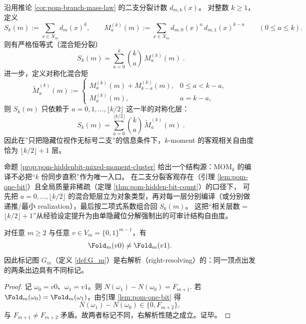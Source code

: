 \begin{proposition}\label{prop:pom-hiddenbit-mixed-moment-cluster}\label{prop:pom-mixed-moment-clusters}
沿用推论 \ref{cor:pom-branch-mass-law} 的二支分裂计数 \(d_{m,b}(x)\)。
对整数 \(k\ge 1\)，定义
\[
S_k(m):=\sum_{x\in X_m} d_m(x)^k,
\qquad
M^{(k)}_{a}(m):=\sum_{x\in X_m} d_{m,0}(x)^a\,d_{m,1}(x)^{k-a}\qquad(0\le a\le k).
\]
则有严格恒等式（混合矩分裂）
\[
\boxed{\;
S_k(m)=\sum_{a=0}^{k}\binom{k}{a}\,M^{(k)}_{a}(m)\; }.
\]
进一步，定义对称化混合矩
\[
\widetilde M^{(k)}_{a}(m):=
\begin{cases}
M^{(k)}_{a}(m)+M^{(k)}_{k-a}(m), & 0\le a<k-a,\\
M^{(k)}_{a}(m), & a=k-a,
\end{cases}
\]
则 \(S_k(m)\) 只依赖于 \(a=0,1,\dots,\lfloor k/2\rfloor\) 这一半的对称化层：
\[
\boxed{\;
S_k(m)=\sum_{a=0}^{\lfloor k/2\rfloor}\binom{k}{a}\,\widetilde M^{(k)}_{a}(m)\; }.
\]
因此在”只把隐藏位视作无标号二支”的信息条件下，\(k\)-moment 的客观相关自由度恰为 \(\lfloor k/2\rfloor+1\) 层。
\end{proposition}

\begin{remark}[含义：以混合矩簇为类型的分层编译]\label{rem:pom-hiddenbit-mixed-moment-typing}
命题 \ref{prop:pom-hiddenbit-mixed-moment-cluster} 给出一个结构源：\(\mathrm{MOM}_k\) 的编译不必把“\(k\) 份同步直积”作为唯一入口。
在二支分裂客观存在（引理 \ref{lem:pom-one-bit}）且全局质量非稀疏（定理 \ref{thm:pom-hidden-bit-count}）的口径下，
可先把 \(a=0,\dots,\lfloor k/2\rfloor\) 的混合矩层立为对象类型，再对每一层分别编译（或分别做递推/最小 realization），最后按二项式系数组合回 \(S_k(m)\)。
这把“相关层数 = \(\lfloor k/2\rfloor+1\)”从经验设定提升为由单隐藏位分解强制出的可审计结构自由度。
\end{remark}

\begin{theorem}[一步可判别与右解析性]\label{thm:pom-right-resolving}
对任意 $m\ge 2$ 与任意 $v\in V_m=\{0,1\}^{m-1}$，有
\[
\Fold_m(v0)\neq \Fold_m(v1).
\]
因此标记图 $G_m$（定义 \ref{def:G_m}）是右解析（right-resolving）的：同一顶点出发的两条出边具有不同标记。
\end{theorem}
\begin{proof}
记 $\omega_0=v0$、$\omega_1=v1$。则 $N(\omega_1)-N(\omega_0)=F_{m+1}$. 若 $\Fold_m(\omega_0)=\Fold_m(\omega_1)$，由引理 \ref{lem:pom-one-bit} 得
\[
N(\omega_1)-N(\omega_0)\in\{0,F_{m+2}\},
\]
与 $F_{m+1}\neq F_{m+2}$ 矛盾。故两者标记不同，右解析性随之成立。证毕。
\end{proof}


